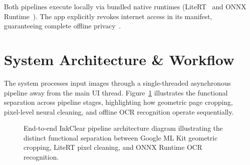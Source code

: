 \documentclass[11pt,a4paper]{article}
\begin{document}
Both pipelines execute locally via bundled native runtimes (LiteRT~\cite{david2021tflite} and ONNX Runtime~\cite{onnxruntime2021}). The app explicitly revokes internet access in its manifest, guaranteeing complete offline privacy~\cite{shi2016edge}.

\section{System Architecture \& Workflow}

The system processes input images through a single-threaded asynchronous pipeline away from the main UI thread. Figure~\ref{fig:pipeline-diagram} illustrates the functional separation across pipeline stages, highlighting how geometric page cropping, pixel-level neural cleaning, and offline OCR recognition operate sequentially.

\begin{figure}[htbp]
  \centering
  \caption{End-to-end InkClear pipeline architecture diagram illustrating the distinct functional separation between Google ML Kit geometric cropping, LiteRT pixel cleaning, and ONNX Runtime OCR recognition.}
  \label{fig:pipeline-diagram}
\end{figure}
\end{document}
